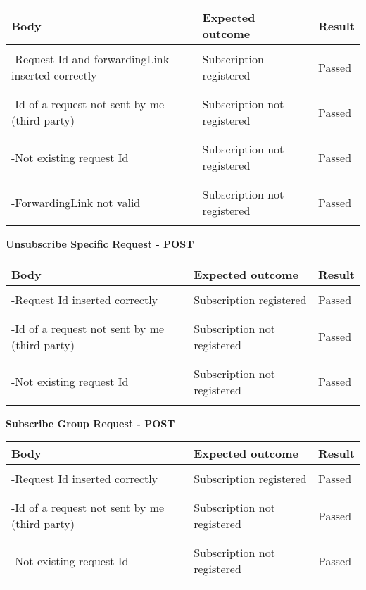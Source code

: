 \begin{center}
	\begin{tabular}{|p{}|p{}|p{}|}
		\hline
		Body & Expected outcome & Result \\
		\hline
		&&\\
		-Request Id and forwardingLink inserted correctly&Subscription registered&Passed\\
		&&\\
		\hline
		&&\\
		-Id of a request not sent by me (third party)&Subscription not registered&Passed\\
		&&\\
		\hline
		&&\\
		-Not existing request Id &Subscription not registered&Passed\\
		&&\\
		\hline
		&&\\
		-ForwardingLink not valid &Subscription not registered&Passed\\
		&&\\
		\hline
	\end{tabular}
\end{center}
\textbf{Unsubscribe Specific Request - POST}
\begin{center}
	\begin{tabular}{|p{}|p{}|p{}|}
		\hline
		Body & Expected outcome & Result \\
		\hline
		&&\\
		-Request Id inserted correctly&Subscription registered&Passed\\
		&&\\
		\hline
		&&\\
		-Id of a request not sent by me (third party)&Subscription not registered&Passed\\
		&&\\
		\hline
		&&\\
		-Not existing request Id &Subscription not registered&Passed\\
		&&\\
		\hline
	\end{tabular}
\end{center}
\textbf{Subscribe Group Request - POST}
\begin{center}
	\begin{tabular}{|p{}|p{}|p{}|}
		\hline
		Body & Expected outcome & Result \\
		\hline
		&&\\
		-Request Id inserted correctly&Subscription registered&Passed\\
		&&\\
		\hline
		&&\\
		-Id of a request not sent by me (third party)&Subscription not registered&Passed\\
		&&\\
		\hline
		&&\\
		-Not existing request Id &Subscription not registered&Passed\\
		&&\\
		\hline
	\end{tabular}
\end{center}
